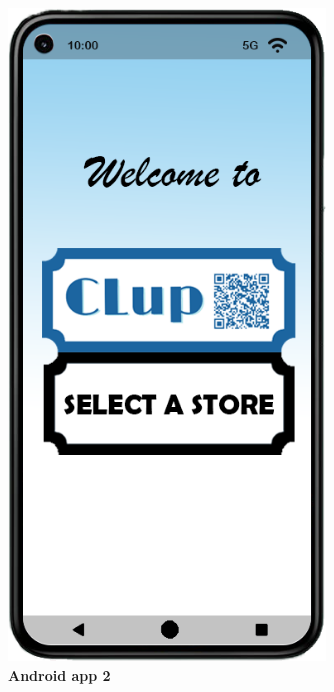 \begin{figure}[!h]
\centering
\begin{minipage}{0.4\textwidth}
\centering
\includegraphics[width=0.75\textwidth]{Images/App/Android_HomeScreenv2}
\caption{\label{fig:android2}\textbf{Android app 2}}
\end{minipage}
\begin{minipage}{0.4\textwidth}
\centering

\end{minipage}
\end{figure}
